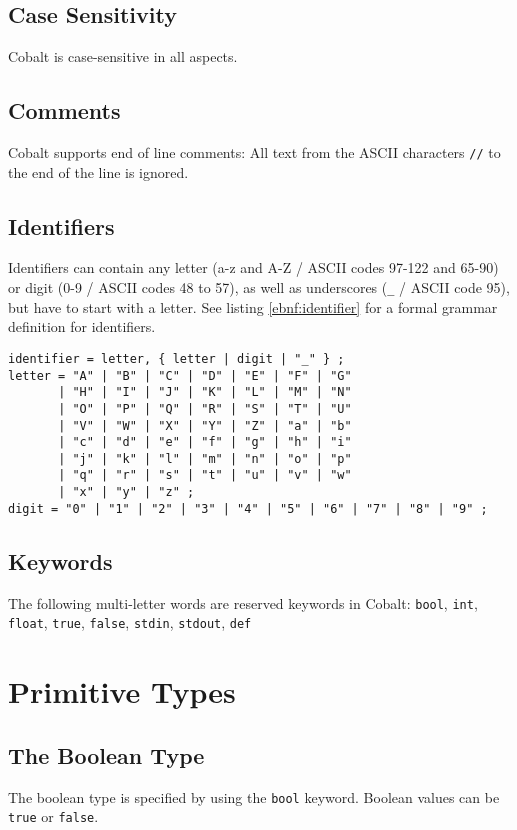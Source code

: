 \documentclass[a4paper,appendixprefix]{scrreprt}
\begin{document}
\section{Case Sensitivity}
Cobalt is case-sensitive in all aspects.

\section{Comments}
Cobalt supports end of line comments: All text from the ASCII characters \verb!//! to the end of the line is ignored.

\section{Identifiers}
Identifiers can contain any letter (a-z and A-Z / ASCII codes 97-122 and 65-90) or digit (0-9 / ASCII codes 48 to 57), as well as underscores (\verb!_! / ASCII code 95), but have to start with a letter. See listing \ref{ebnf:identifier} for a formal grammar definition for identifiers.

\begin{lstlisting}[label={ebnf:identifier},caption={Identifier Grammar}]
identifier = letter, { letter | digit | "_" } ;
letter = "A" | "B" | "C" | "D" | "E" | "F" | "G"
       | "H" | "I" | "J" | "K" | "L" | "M" | "N"
       | "O" | "P" | "Q" | "R" | "S" | "T" | "U"
       | "V" | "W" | "X" | "Y" | "Z" | "a" | "b"
       | "c" | "d" | "e" | "f" | "g" | "h" | "i"
       | "j" | "k" | "l" | "m" | "n" | "o" | "p"
       | "q" | "r" | "s" | "t" | "u" | "v" | "w"
       | "x" | "y" | "z" ;
digit = "0" | "1" | "2" | "3" | "4" | "5" | "6" | "7" | "8" | "9" ;
\end{lstlisting}

\section{Keywords}
The following multi-letter words are reserved keywords in Cobalt: \verb!bool!, \verb!int!, \verb!float!, \verb!true!, \verb!false!, \verb!stdin!, \verb!stdout!, \verb!def!

\chapter{Primitive Types}

\section{The Boolean Type}
The boolean type is specified by using the \verb!bool! keyword. Boolean values can be \verb!true! or \verb!false!.
\end{document}
